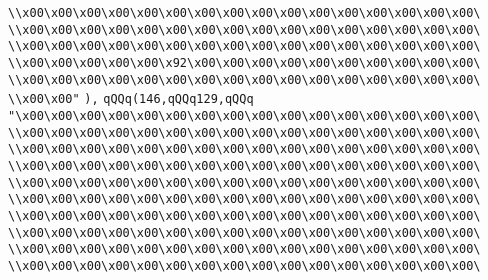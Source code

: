 \verb|\\x00\x00\x00\x00\x00\x00\x00\x00\x00\x00\x00\x00\x00\x00\x00\x00\|\newline
\verb|\\x00\x00\x00\x00\x00\x00\x00\x00\x00\x00\x00\x00\x00\x00\x00\x00\|\newline
\verb|\\x00\x00\x00\x00\x00\x00\x00\x00\x00\x00\x00\x00\x00\x00\x00\x00\|\newline
\verb|\\x00\x00\x00\x00\x00\x92\x00\x00\x00\x00\x00\x00\x00\x00\x00\x00\|\newline
\verb|\\x00\x00\x00\x00\x00\x00\x00\x00\x00\x00\x00\x00\x00\x00\x00\x00\|\newline
\verb|\\x00\x00"|\newline
\verb|),|\newline
\verb|qQQq(146,qQQq129,qQQq|\newline
\verb|"\x00\x00\x00\x00\x00\x00\x00\x00\x00\x00\x00\x00\x00\x00\x00\x00\|\newline
\verb|\\x00\x00\x00\x00\x00\x00\x00\x00\x00\x00\x00\x00\x00\x00\x00\x00\|\newline
\verb|\\x00\x00\x00\x00\x00\x00\x00\x00\x00\x00\x00\x00\x00\x00\x00\x00\|\newline
\verb|\\x00\x00\x00\x00\x00\x00\x00\x00\x00\x00\x00\x00\x00\x00\x00\x00\|\newline
\verb|\\x00\x00\x00\x00\x00\x00\x00\x00\x00\x00\x00\x00\x00\x00\x00\x00\|\newline
\verb|\\x00\x00\x00\x00\x00\x00\x00\x00\x00\x00\x00\x00\x00\x00\x00\x00\|\newline
\verb|\\x00\x00\x00\x00\x00\x00\x00\x00\x00\x00\x00\x00\x00\x00\x00\x00\|\newline
\verb|\\x00\x00\x00\x00\x00\x00\x00\x00\x00\x00\x00\x00\x00\x00\x00\x00\|\newline
\verb|\\x00\x00\x00\x00\x00\x00\x00\x00\x00\x00\x00\x00\x00\x00\x00\x00\|\newline
\verb|\\x00\x00\x00\x00\x00\x00\x00\x00\x00\x00\x00\x00\x00\x00\x00\x00\|\newline
